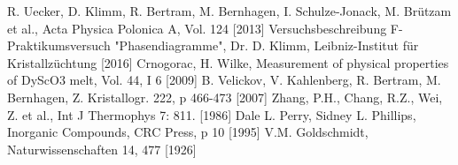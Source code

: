 \documentclass[aps,twocolumn,secnumarabic,nobalancelastpage,amsmath,amssymb,
nofootinbib,superscriptaddress]{revtex4-1}
\begin{document}


\begin{thebibliography}{99}
R. Uecker, D. Klimm, R. Bertram, M. Bernhagen, I. Schulze-Jonack, M. Brützam et al., Acta Physica Polonica A, Vol. 124 [2013]
Versuchsbeschreibung F-Praktikumsversuch "Phasendiagramme", Dr. D. Klimm, Leibniz-Institut für Kristallzüchtung [2016]
Crnogorac, H. Wilke, Measurement of physical properties of DyScO3 melt, Vol. 44, I 6 [2009]
B. Velickov, V. Kahlenberg, R. Bertram, M. Bernhagen, Z. Kristallogr. 222, p 466-473 [2007]
Zhang, P.H., Chang, R.Z., Wei, Z. et al., Int J Thermophys 7: 811. [1986]
Dale L. Perry, Sidney L. Phillips, Inorganic Compounds, CRC Press, p 10 [1995]
V.M. Goldschmidt, Naturwissenschaften 14, 477 [1926]
\end{thebibliography}


\clearpage
\appendix

\end{document}
